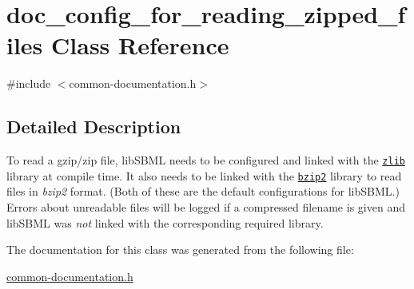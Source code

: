 \hypertarget{classdoc__config__for__reading__zipped__files}{}\section{doc\+\_\+config\+\_\+for\+\_\+reading\+\_\+zipped\+\_\+files Class Reference}
\label{classdoc__config__for__reading__zipped__files}


{\ttfamily \#include $<$common-\/documentation.\+h$>$}



\subsection{Detailed Description}
\begin{DoxyParagraph}{}
To read a gzip/zip file, lib\+S\+B\+ML needs to be configured and linked with the \href{http://www.zlib.net/}{\tt zlib} library at compile time. It also needs to be linked with the \href{}{\tt bzip2} library to read files in {\itshape bzip2} format. (Both of these are the default configurations for lib\+S\+B\+ML.) Errors about unreadable files will be logged if a compressed filename is given and lib\+S\+B\+ML was {\itshape not} linked with the corresponding required library. 
\end{DoxyParagraph}


The documentation for this class was generated from the following file\+:\begin{DoxyCompactItemize}
\item 
\hyperlink{common-documentation_8h}{common-\/documentation.\+h}\end{DoxyCompactItemize}
